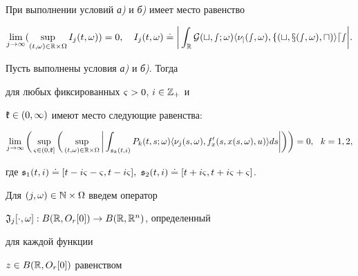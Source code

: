 \begin{lems}


При выполнении условий {\em а)} и {\em б)} имеет место равенство


\begin{equation}


\lim\lt_{j\to\infty}(\sup\lt_{(t,\om)\in\R\times\Om}I_{j}(t,\om))=0,


\quad I_{j}(t,\om)\doteq


\bigg|\int_{\R}\cal G(t,s;\omega)


\la\nu_{j}(s,\om),f(t,x(s,\om),u)\ra ds\bigg|.


\end{equation}


\end{lems}





\begin{lems}


Пусть выполнены условия {\em а)} и {\em б)}. Тогда


для любых фиксированных $\varsigma>0$, $i\in\Bbb Z_{+}$ и


$\frak k\in(0,\infty)$ имеют место следующие равенства\/$:$


\begin{equation}


\lim\lt_{j\to\infty}\bigg(\sup\lt_{\vsg\in(0,\frak k]}\bigg(


\sup\lt_{(t,\om)\in\R\times\Om}


\bigg|\int_{\frak s_{k}(t,i)}P_{k}(t,s;\omega)


\la\nu_{j}(s,\om),f'_{x}(s,x(s,\om),u)\ra ds\bigg|\bigg)\bigg)=0,\ \ k=1,2,


\end{equation}


где $\frak s_{1}(t,i)\doteq [t-i\vsg-\vsg,t-i\vsg],\ \frak s_{2}(t,i)\doteq


[t+i\vsg,t+i\vsg+\vsg]$.


\end{lems}





Для $(j,\omega)\in\Bbb N\times\Omega$ введем оператор


$\frak J_{j}[\cdot,\omega]: B(\Bbb R,O_{r}[0])\to B(\Bbb R,\Bbb R^{n})$, определенный


для каждой функции


$z\in B(\Bbb R,O_{r}[0])$ равенством



